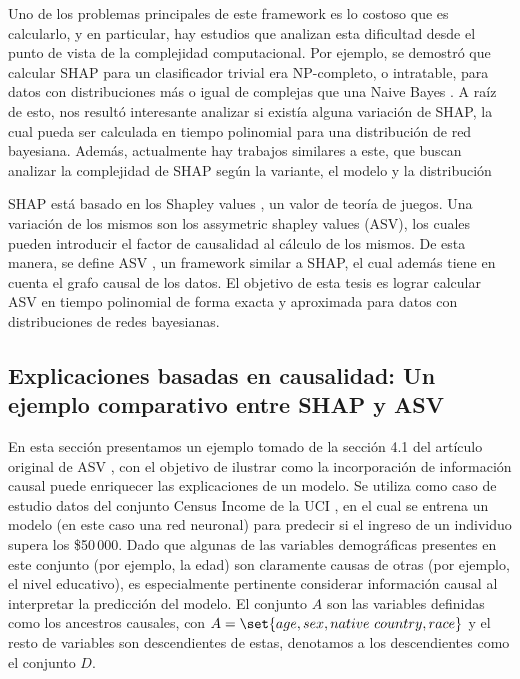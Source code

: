 Uno de los problemas principales de este framework es lo costoso que es calcularlo, y en particular, hay estudios que analizan esta dificultad desde el punto de vista de la complejidad computacional. Por ejemplo, se demostró que calcular SHAP para un clasificador trivial era NP-completo, o intratable, para datos con distribuciones más o igual de complejas que una Naive Bayes \cite{arenas2021tractability}.
A raíz de esto, nos resultó interesante analizar si existía alguna variación de SHAP, la cual pueda ser calculada en tiempo polinomial para una distribución de red bayesiana. Además, actualmente hay trabajos similares a este, que buscan analizar la complejidad de SHAP según la variante, el modelo y la distribución \cite{marzouk2025computationaltractabilitymanyshapley} %

SHAP está basado en los Shapley values \cite{shapley1953value}, un valor de teoría de juegos.  Una variación de los mismos son los assymetric shapley values (ASV), los cuales pueden introducir el factor de causalidad al cálculo de los mismos. De esta manera, se define ASV \cite{frye2019asymmetric}, un framework similar a SHAP, el cual además tiene en cuenta el grafo causal de los datos. El objetivo de esta tesis es lograr calcular ASV en tiempo polinomial de forma exacta y aproximada para datos con distribuciones de redes bayesianas.

\subsection{Explicaciones basadas en causalidad: Un ejemplo comparativo entre SHAP y ASV} \label{asvCaseExample}

En esta sección presentamos un ejemplo tomado de la sección 4.1 del artículo original de ASV \cite{frye2019asymmetric}, con el objetivo de ilustrar como la incorporación de información causal puede enriquecer las explicaciones de un modelo. Se utiliza como caso de estudio datos del conjunto Census Income de la UCI \cite{dua2017uci}, en el cual se entrena un modelo (en este caso una red neuronal) para predecir si el ingreso de un individuo supera los \$50\,000. Dado que algunas de las variables demográficas presentes en este conjunto (por ejemplo, la edad) son claramente causas de otras (por ejemplo, el nivel educativo), es especialmente pertinente considerar información causal al interpretar la predicción del modelo. El conjunto $A$ son las variables definidas como los ancestros causales, con $A= \set{age, sex, native \ country, race}$ y el resto de variables son descendientes de estas, denotamos a los descendientes como el conjunto $D$. 

